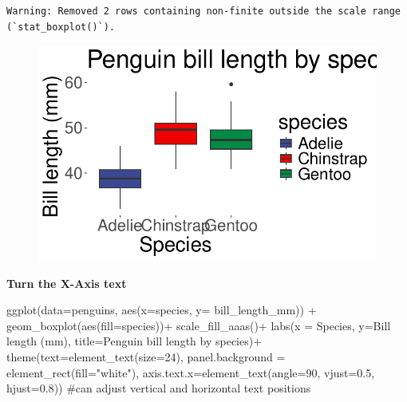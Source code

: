 \documentclass[
  letterpaper,
  DIV=11,
  numbers=noendperiod]{scrartcl}
\newenvironment{Shaded}{\begin{snugshade}}{\end{snugshade}}
\newcommand{\AttributeTok}[1]{\textcolor[rgb]{0.40,0.45,0.13}{#1}}
\newcommand{\CommentTok}[1]{\textcolor[rgb]{0.37,0.37,0.37}{#1}}
\newcommand{\DecValTok}[1]{\textcolor[rgb]{0.68,0.00,0.00}{#1}}
\newcommand{\FloatTok}[1]{\textcolor[rgb]{0.68,0.00,0.00}{#1}}
\newcommand{\FunctionTok}[1]{\textcolor[rgb]{0.28,0.35,0.67}{#1}}
\newcommand{\NormalTok}[1]{\textcolor[rgb]{0.00,0.23,0.31}{#1}}
\newcommand{\SpecialCharTok}[1]{\textcolor[rgb]{0.37,0.37,0.37}{#1}}
\newcommand{\StringTok}[1]{\textcolor[rgb]{0.13,0.47,0.30}{#1}}
\begin{document}
\begin{verbatim}
Warning: Removed 2 rows containing non-finite outside the scale range
(`stat_boxplot()`).
\end{verbatim}

\begin{figure}[H]

{\centering \includegraphics{Lab_2_files/figure-pdf/unnamed-chunk-45-1.pdf}

}

\end{figure}

\textbf{Turn the X-Axis text}

\begin{Shaded}
\begin{Highlighting}[]
\FunctionTok{ggplot}\NormalTok{(}\AttributeTok{data=}\NormalTok{penguins, }\FunctionTok{aes}\NormalTok{(}\AttributeTok{x=}\NormalTok{species, }\AttributeTok{y=}\NormalTok{ bill\_length\_mm)) }\SpecialCharTok{+}
  \FunctionTok{geom\_boxplot}\NormalTok{(}\FunctionTok{aes}\NormalTok{(}\AttributeTok{fill=}\NormalTok{species))}\SpecialCharTok{+}
  \FunctionTok{scale\_fill\_aaas}\NormalTok{()}\SpecialCharTok{+}
  \FunctionTok{labs}\NormalTok{(}\AttributeTok{x =} \StringTok{\textquotesingle{}Species\textquotesingle{}}\NormalTok{, }\AttributeTok{y=}\StringTok{\textquotesingle{}Bill length (mm)\textquotesingle{}}\NormalTok{, }\AttributeTok{title=}\StringTok{\textquotesingle{}Penguin bill length by species\textquotesingle{}}\NormalTok{)}\SpecialCharTok{+}
  \FunctionTok{theme}\NormalTok{(}\AttributeTok{text=}\FunctionTok{element\_text}\NormalTok{(}\AttributeTok{size=}\DecValTok{24}\NormalTok{), }\AttributeTok{panel.background =} \FunctionTok{element\_rect}\NormalTok{(}\AttributeTok{fill=}\StringTok{"white"}\NormalTok{), }\AttributeTok{axis.text.x=}\FunctionTok{element\_text}\NormalTok{(}\AttributeTok{angle=}\DecValTok{90}\NormalTok{, }\AttributeTok{vjust=}\FloatTok{0.5}\NormalTok{, }\AttributeTok{hjust=}\FloatTok{0.8}\NormalTok{)) }\CommentTok{\#can adjust vertical and horizontal text positions}
\end{Highlighting}
\end{Shaded}
\end{document}
